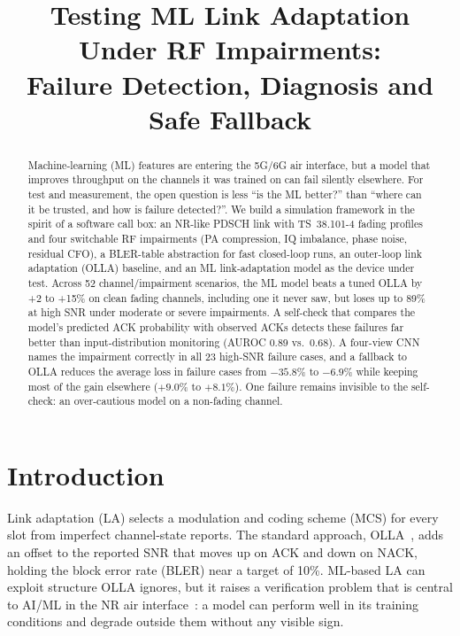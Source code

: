 \documentclass[conference]{IEEEtran}
\begin{document}
\title{Testing ML Link Adaptation Under RF Impairments:\\
Failure Detection, Diagnosis and Safe Fallback}

\author{
}

\maketitle

\begin{abstract}
Machine-learning (ML) features are entering the 5G/6G air interface, but a model that
improves throughput on the channels it was trained on can fail silently elsewhere. For test
and measurement, the open question is less ``is the ML better?'' than ``where can it be
trusted, and how is failure detected?''. We build a simulation framework in the spirit of a
software call box: an NR-like PDSCH link with TS~38.101-4 fading profiles and four switchable
RF impairments (PA compression, IQ imbalance, phase noise, residual CFO), a BLER-table
abstraction for fast closed-loop runs, an outer-loop link adaptation (OLLA) baseline, and an
ML link-adaptation model as the device under test. Across 52 channel/impairment scenarios,
the ML model beats a tuned OLLA by +2 to +15\% on clean fading channels, including one it never
saw, but loses up to 89\% at high SNR under moderate or severe impairments. A self-check
that compares the model's predicted ACK probability with observed ACKs detects these failures
far better than input-distribution monitoring (AUROC 0.89 vs.\ 0.68). A four-view CNN names
the impairment correctly in all 23 high-SNR failure cases, and a fallback to OLLA reduces the
average loss in failure cases from $-35.8\%$ to $-6.9\%$ while keeping most of the gain
elsewhere ($+9.0\%$ to $+8.1\%$). One failure remains invisible to the self-check: an
over-cautious model on a non-fading channel.
\end{abstract}

\section{Introduction}
Link adaptation (LA) selects a modulation and coding scheme (MCS) for every slot from
imperfect channel-state reports. The standard approach, OLLA~\cite{nakamura2002}, adds an
offset to the reported SNR that moves up on ACK and down on NACK, holding the block error rate
(BLER) near a target of 10\%. ML-based LA can exploit structure OLLA ignores, but it raises a
verification problem that is central to AI/ML in the NR air interface~\cite{tr38843}: a model
can perform well in its training conditions and degrade outside them without any visible
sign.
\end{document}
